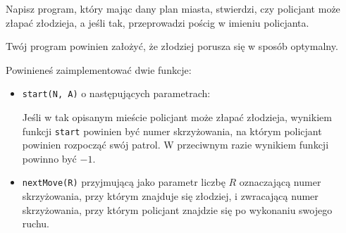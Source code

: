 \documentclass{boi2014-pl}
\renewcommand{\method}[1]{{\tt #1}}
\begin{document}
    \Task
    Napisz program, który mając dany plan miasta, stwierdzi, czy policjant może
    złapać złodzieja, a jeśli tak, przeprowadzi pościg w imieniu policjanta.

    Twój program powinien założyć, że złodziej porusza się w sposób optymalny.

    \Implementation
    Powinieneś zaimplementować dwie funkcje:
    \begin{itemize}
        \item \method{start(N, A)} o następujących parametrach:

        Jeśli w tak opisanym mieście policjant może złapać złodzieja,
        wynikiem funkcji \method{start} powinien być numer skrzyżowania,
        na którym policjant powinien rozpocząć swój patrol.
        W przeciwnym razie wynikiem funkcji powinno być $-1$.

        \item \method{nextMove(R)} przyjmującą jako parametr liczbę
            $R$ oznaczającą numer skrzyżowania, przy którym znajduje się złodziej,
            i zwracającą numer skrzyżowania, przy którym policjant znajdzie się
            po wykonaniu swojego ruchu.
    \end{itemize}
\end{document}
